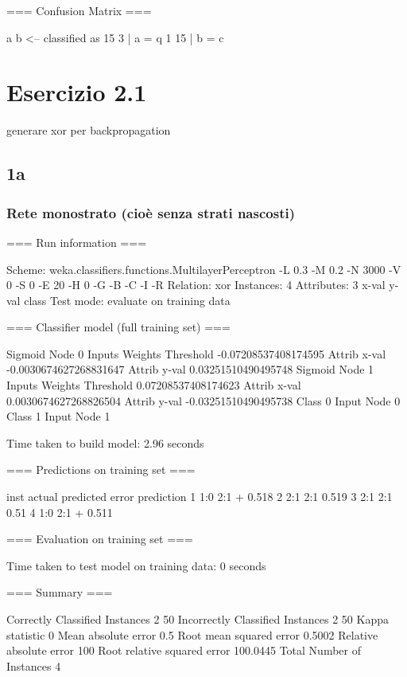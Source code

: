 \documentclass{report}
\begin{document}
	=== Confusion Matrix ===
	
	a  b   <-- classified as
	15  3 |  a = q
	1 15 |  b = c
	
	
	\part{Esercizio 2.1}
	generare xor per backpropagation
	
	\chapter{1a}
	
	\section{Rete monostrato (cioè senza strati nascosti) }
	=== Run information ===
	
	Scheme:       weka.classifiers.functions.MultilayerPerceptron -L 0.3 -M 0.2 -N 3000 -V 0 -S 0 -E 20 -H 0 -G -B -C -I -R
	Relation:     xor
	Instances:    4
	Attributes:   3
	x-val
	y-val
	class
	Test mode:    evaluate on training data
	
	=== Classifier model (full training set) ===
	
	Sigmoid Node 0
	Inputs    Weights
	Threshold    -0.07208537408174595
	Attrib x-val    -0.0030674627268831647
	Attrib y-val    0.03251510490495748
	Sigmoid Node 1
	Inputs    Weights
	Threshold    0.07208537408174623
	Attrib x-val    0.0030674627268826504
	Attrib y-val    -0.03251510490495738
	Class 0
	Input
	Node 0
	Class 1
	Input
	Node 1
	
	
	Time taken to build model: 2.96 seconds
	
	=== Predictions on training set ===
	
	inst     actual  predicted error prediction
	1        1:0        2:1   +   0.518 
	2        2:1        2:1       0.519 
	3        2:1        2:1       0.51 
	4        1:0        2:1   +   0.511 
	
	=== Evaluation on training set ===
	
	Time taken to test model on training data: 0 seconds
	
	=== Summary ===
	
	Correctly Classified Instances           2               50      %
	Incorrectly Classified Instances         2               50      %
	Kappa statistic                          0     
	Mean absolute error                      0.5   
	Root mean squared error                  0.5002
	Relative absolute error                100      %
	Root relative squared error            100.0445 %
	Total Number of Instances                4     
	
\end{document}
